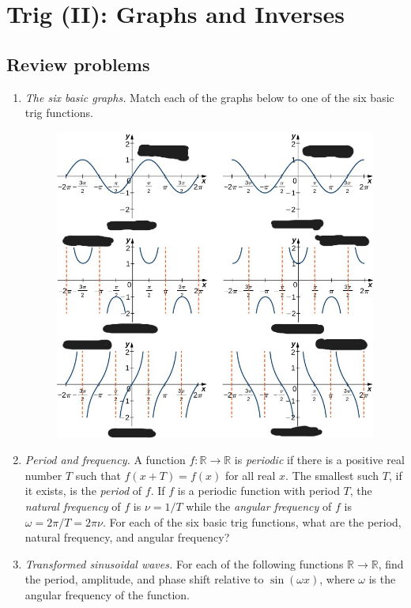 \section{Trig (II): Graphs and Inverses}

\subsection{Review problems}

\begin{enumerate}
\item \emph{The six basic graphs.} Match each of the graphs below to one of the six basic trig functions.
\begin{figure}[H]
\centering
\includegraphics[scale=0.7]{img-trig-graphs.jpg}
\end{figure}
\item \emph{Period and frequency.} A function $f:\mathbb{R}\to\mathbb{R}$ is \emph{periodic} if there is a positive real number $T$ such that $f(x + T) = f(x)$ for all real $x$. The smallest such $T$, if it exists, is the \emph{period} of $f$. If $f$ is a periodic function with period $T$, the \emph{natural frequency} of $f$ is $\nu = 1/T$ while the \emph{angular frequency} of $f$ is $\omega = 2\pi/T = 2\pi\nu$. For each of the six basic trig functions, what are the period, natural frequency, and angular frequency?
\item \emph{Transformed sinusoidal waves.} For each of the following functions $\mathbb{R}\to\mathbb{R}$, find the period, amplitude, and phase shift relative to $\sin(\omega x)$, where $\omega$ is the angular frequency of the function.

\end{enumerate}
